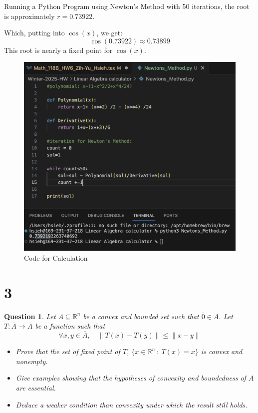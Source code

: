 \documentclass{article}
\newtheorem{question}{Question}
\begin{document}
Running a Python Program using Newton's Method with 50 iterations, the root is approximately $r=0.73922$.

Which, putting into $\cos(x)$, we get:
$$\cos(0.73922)\approx 0.73899$$
This root is nearly a fixed point for $\cos(x)$.

\begin{figure}[h!]
    \begin{center}
        \includegraphics*[width=120mm]{newtons method.png}
        \caption{Code for Calculation}
    \end{center}
\end{figure}


\break

\section*{3}
\begin{myBox}[]{}
    \begin{question}
        Let $A\subseteq \mathbb{R}^n$ be a convex and bounded set such that $\bar{0}\in A$. 
        Let $T:\overline{A}\rightarrow\overline{A}$ be a function such that 
        $$\forall x,y\in\overline{A},\quad \|T(x)-T(y)\|\leq \|x-y\|$$
        \begin{itemize}
            \item[(a)] Prove that the set of fixed point of $T$, $\{x\in\mathbb{R}^n\ :\ T(x)=x\}$ is convex and nonempty.
            \item[(b)] Give examples showing that the hypotheses of convexity and boundedness of $A$ are essential.
            \item[(c)] Deduce a weaker condition than convexity under which the result still holds.  
        \end{itemize}
    \end{question}
\end{myBox}
\end{document}
